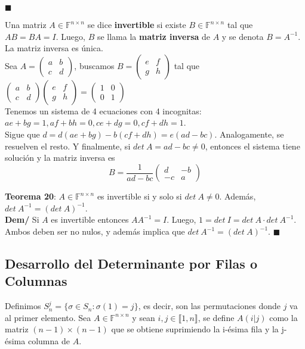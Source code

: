 \documentclass[11pt,a4paper]{article}
\newcommand*{\QEDA}{\null\nobreak\hfill\ensuremath{\blacksquare}}
\begin{document}
\QEDA 


\newpage

Una matriz $A \in \mathbb{F}^{n \times n}$ se dice \textbf{invertible} si existe $B \in \mathbb{F}^{n \times n}$ tal que $AB=BA=I$. Luego, $B$ se llama la \textbf{matriz inversa} de $A$ y se denota $B = A^{-1}$. La matriz inversa es \'unica.\\

Sea $A = \begin{pmatrix} a & b \\ c & d\end{pmatrix}$, buscamos $B = \begin{pmatrix} e & f \\ g & h\end{pmatrix}$ tal que $\begin{pmatrix} a & b \\ c & d\end{pmatrix} \begin{pmatrix} e & f \\ g & h\end{pmatrix} = \begin{pmatrix} 1 & 0 \\ 0 & 1\end{pmatrix}$\\

Tenemos un sistema de 4 ecuaciones con 4 incognitas: $ae+bg = 1, af+bh=0, ce+dg=0, cf+dh=1$. \\ 
Sigue que $d = d(ae + bg) - b(cf + dh) = e (ad-bc)$. Analogamente, se resuelven el resto. Y finalmente, si $det\ A = ad-bc \not = 0$, entonces el sistema tiene soluci\'on y la matriz inversa es $$B = \frac{1}{ad-bc} \begin{pmatrix} d & -b \\ -c & a \end{pmatrix}$$

\textbf{Teorema 20}: $A \in \mathbb{F}^{n \times n}$ es invertible si y solo si $det\ A \not = 0$. Adem\'as, $det\ A^{-1} = (det\ A)^{-1}$.\\
\textbf{Dem/} Si $A$ es invertible entonces $AA^{-1} = I$. Luego, $1 = det\ I = det\ A \cdot det\ A^{-1}$. Ambos deben ser no nulos, y adem\'as implica que $det\ A^{-1} = (det\ A)^{-1}$. \QEDA

\subsection{Desarrollo del Determinante por Filas o Columnas}
Definimos $S_n^j = \{ \sigma \in S_n : \sigma(1) = j \}$, es decir, son las permutaciones donde $j$ va al primer elemento.
Sea $A \in \mathbb{F}^{n \times n}$ y sean $i,j \in \llbracket 1,n \rrbracket$, se define $A(i|j)$ como la matriz $(n-1)\times(n-1)$ que se obtiene suprimiendo la i-\'esima fila y la j-\'esima columna de $A$.
\end{document}
